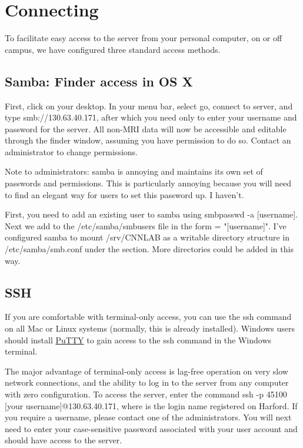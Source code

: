 \documentclass[final,titlepage,letterpaper,oneside,12pt]{article}
\renewcommand{\texttt}[2][BrickRed]{\textcolor{#1}{\ttfamily #2}}%
\begin{document}
\section{Connecting}

To facilitate easy access to the server from your personal computer, on or off campus, we have configured three standard access methods.

\subsection{Samba: Finder access in OS X}
First, click on your desktop. In your menu bar, select \texttt{go}, \texttt{connect to server}, and type \texttt{smb://130.63.40.171}, after which you need only to enter your username and password for the server. All non-MRI data will now be accessible and editable through the finder window, assuming you have permission to do so. Contact an administrator to change permissions.

Note to administrators: samba is annoying and maintains its own set of passwords and permissions. This is particularly annoying because you will need to find an elegant way for users to set this password up. I haven't.

First, you need to add an existing user to samba using \texttt{smbpasswd -a [username]}. Next we add \texttt{[username]}  to the \texttt{/etc/samba/smbusers} file in the form \texttt{[username] = "[username]"}. I've configured samba to mount \texttt{/srv/CNNLAB} as a writable directory structure in \texttt{/etc/samba/smb.conf} under the \texttt{[CNNLAB]} section. More directories could be added in this way. 

\subsection{SSH}

If you are comfortable with terminal-only access, you can use the \texttt{ssh} command on all Mac or Linux systems (normally, this is already installed). Windows users should install \href{http://www.chiark.greenend.org.uk/~sgtatham/putty/}{PuTTY} to gain access to the \texttt{ssh} command in the Windows terminal.

The major advantage of terminal-only access is lag-free operation on very slow network connections, and the ability to log in to the server from any computer with zero configuration. To access the server, enter the command \texttt{ssh -p 45100 [your username]@130.63.40.171}, where \texttt{[your username]} is the login name registered on Harford. If you require a username, please contact one of the administrators. You will next need to enter your case-sensitive password associated with your user account and should have access to the server.
\end{document}

